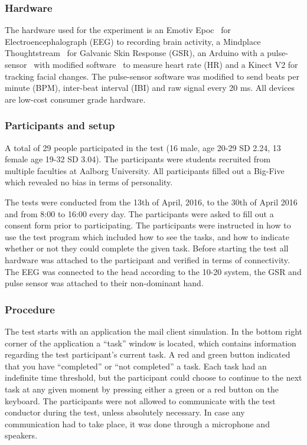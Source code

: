 \subsubsection{Hardware}
The hardware used for the experiment is an Emotiv Epoc~\cite{emotiv_epoc_website} for Electroencephalograph (EEG) to recording brain activity, a Mindplace Thoughtstream~\cite{thoughtstream} for Galvanic Skin Response (GSR), an Arduino with a pulse-sensor~\cite{pulsesensor} with modified software~\cite{pulsesensorgit} to measure heart rate (HR) and a Kinect V2\cite{kinect_specs3} for tracking facial changes.
The pulse-sensor software was modified to send beats per minute (BPM), inter-beat interval (IBI) and raw signal every 20 ms.
All devices are low-cost consumer grade hardware.

\subsubsection{Participants and setup}
A total of 29 people participated in the test (16 male, age 20-29 SD 2.24, 13 female age 19-32 SD 3.04).
The participants were students recruited from multiple faculties at Aalborg University. 
All participants filled out a Big-Five\cite{big5} which revealed no bias in terms of personality.

The tests were conducted from the 13th of April, 2016, to the 30th of April 2016 and from 8:00 to 16:00 every day. 
The participants were asked to fill out a consent form prior to participating. 
The participants were instructed in how to use the test program which included how to see the tasks, and how to indicate whether or not they could complete the given task. 
Before starting the test all hardware was attached to the participant and verified in terms of connectivity. 
The EEG was connected to the head according to the 10-20 system\cite{eeg_tech_10_20}, the GSR and pulse sensor was attached to their non-dominant hand. 

\subsubsection{Procedure}
The test starts with an application the mail client simulation.
In the bottom right corner of the application a ``task'' window is located, which contains information regarding the test participant's current task. 
A red and green button indicated that you have ``completed'' or ``not completed'' a task.  
Each task had an indefinite time threshold, but the participant could choose to continue to the next task at any given moment by pressing either a green or a red button on the keyboard. 
The participants were not allowed to communicate with the test conductor during the test, unless absolutely necessary. 
In case any communication had to take place, it was done through a microphone and speakers.

